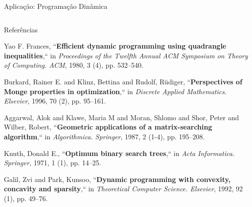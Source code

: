 \documentclass[final]{beamer}
\begin{document}
\begin{frame}[t]
\begin{columns}[t]
\begin{column}{0.60\paperwidth}
\begin{columns}[c,totalwidth=0.60\paperwidth]
\begin{column}{0.5\columnwidth}
\begin{block}{Aplicação: Programação Dinâmica}
        \end{block}
    \end{column}

    \end{columns}


    \begin{block}{Referências}
        \scriptsize{\begin{thebibliography}{50}
        Yao F. Frances, ``\textbf{Efficient dynamic programming using quadrangle inequalities},`` in \textit{Proceedings of the Twelfth Annual ACM Symposium on Theory of Computing. ACM}, 1980, 3 (4), pp. 532--540.

        Burkard, Rainer E. and Klinz, Bettina and Rudolf, R{\"u}diger, ``\textbf{Perspectives of Monge properties in optimization},`` in \textit{Discrete Applied Mathematics. Elsevier}, 1996, 70 (2), pp. 95--161.

        Aggarwal, Alok and Klawe, Maria M and Moran, Shlomo and Shor, Peter and Wilber, Robert, ``\textbf{Geometric applications of a matrix-searching algorithm},`` in \textit{Algorithmica. Springer}, 1987, 2 (1-4), pp. 195--208.

        Knuth, Donald E., ``\textbf{Optimum binary search trees},`` in \textit{Acta Informatica. Springer,} 1971, 1 (1), pp. 14--25.

        Galil, Zvi and Park, Kunsoo, ``\textbf{Dynamic programming with convexity, concavity and sparsity},`` in \textit{Theoretical Computer Science. Elsevier}, 1992, 92 (1), pp. 49--76.

        \end{thebibliography}}
    \end{block}

\end{column}

\end{columns}
\end{frame}
\end{document}
